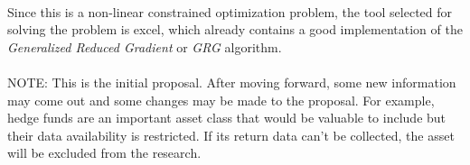 \documentclass[]{article}
\begin{document}
\paragraph{}Since this is a non-linear constrained optimization problem, the tool selected for solving the problem is excel, which already contains a good implementation of the \textit{Generalized Reduced Gradient} or \textit{GRG} algorithm.
\paragraph{}NOTE: This is the initial proposal. After moving forward, some new information may come out and some changes may be made to the proposal. For example, hedge funds are an important asset class that would be valuable to include but their data availability is restricted. If its return data can't be collected, the asset will be excluded from the research.
\end{document}
